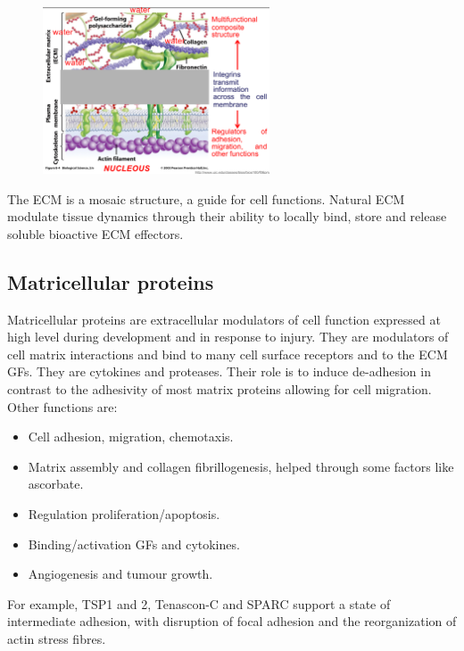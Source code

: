 	\begin{figure}[ht]
	\centering
	\includegraphics[width=0.6\textwidth]{structure}
	\caption{\label{fig:structure}}
	\end{figure}

	The ECM is a mosaic structure, a guide for cell functions.
	Natural ECM modulate tissue dynamics through their ability to locally bind, store and release soluble bioactive ECM effectors.


	\subsection{Matricellular proteins}
	Matricellular proteins are extracellular modulators of cell function expressed at high level during development and in response to injury.
	They are modulators of cell matrix interactions and bind to many cell surface receptors and to the ECM GFs.
	They are cytokines and proteases.
	Their role is to induce de-adhesion in contrast to the adhesivity of most matrix proteins allowing for cell migration.
	Other functions are:

	\begin{multicols}{2}
		\begin{itemize}
			\item Cell adhesion, migration, chemotaxis.
			\item Matrix assembly and collagen fibrillogenesis, helped through some factors like ascorbate.
			\item Regulation proliferation/apoptosis.
			\item Binding/activation GFs and cytokines.
			\item Angiogenesis and tumour growth.
		\end{itemize}
	\end{multicols}

	For example, TSP1 and 2, Tenascon-C and SPARC support a state of intermediate adhesion, with disruption of focal adhesion and the reorganization of actin stress fibres.

